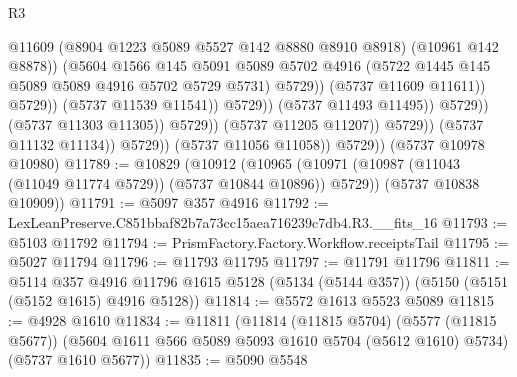 \begin{lexlean}{R3}
\begin{coremodule}
                                                  @11609
                                                  (@8904 @1223 @5089 @5527 @142 @8880 @8910 @8918)
                                                  (@10961 @142 @8878))
                                                (@5604
                                                  @1566
                                                  @145
                                                  @5091
                                                  @5089
                                                  @5702
                                                  @4916
                                                  (@5722
                                                    @1445
                                                    @145
                                                    @5089
                                                    @5089
                                                    @4916
                                                    @5702
                                                    @5729
                                                    @5731)
                                                  @5729))
                                              (@5737 @11609 @11611))
                                            @5729))
                                        (@5737 @11539 @11541))
                                      @5729))
                                  (@5737 @11493 @11495))
                                @5729))
                            (@5737 @11303 @11305))
                          @5729))
                      (@5737 @11205 @11207))
                    @5729))
                (@5737 @11132 @11134))
              @5729))
          (@5737 @11056 @11058))
        @5729))
    (@5737 @10978 @10980)
@11789 := @10829
    (@10912
      (@10965 (@10971 (@10987 (@11043 (@11049 @11774 @5729)) (@5737 @10844 @10896)) @5729))
      (@5737 @10838 @10909))
@11791 := @5097 @357 @4916
@11792 := LexLeanPreserve.C851bbaf82b7a73cc15aea716239c7db4.R3.__fits_16
@11793 := @5103 @11792
@11794 := PrismFactory.Factory.Workflow.receiptsTail
@11795 := @5027 @11794
@11796 := @11793 @11795
@11797 := @11791 @11796
@11811 := @5114
    @357
    @4916
    @11796
    @1615
    @5128
    (@5134 (@5144 @357))
    (@5150 (@5151 (@5152 @1615) @4916 @5128))
@11814 := @5572 @1613 @5523 @5089
@11815 := @4928 @1610
@11834 := @11811
    (@11814
      (@11815 @5704)
      (@5577 (@11815 @5677))
      (@5604 @1611 @566 @5089 @5093 @1610 @5704 (@5612 @1610) @5734)
      (@5737 @1610 @5677))
@11835 := @5090 @5548

\end{coremodule}
\end{lexlean}
